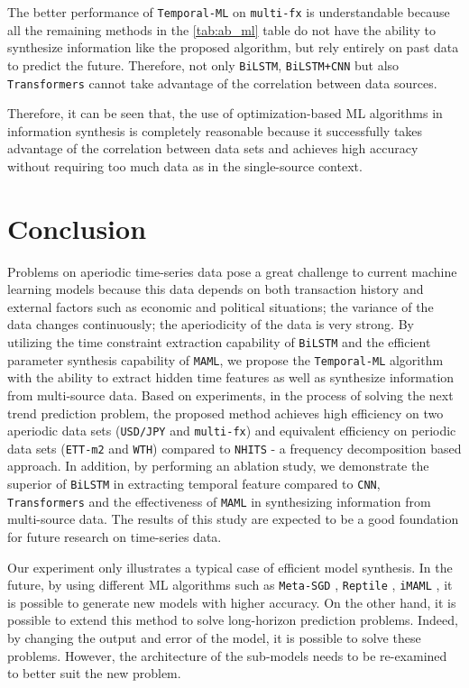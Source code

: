 \documentclass[a4paper,fleqn]{cas-sc}
\begin{document}
The better performance of \verb|Temporal-ML| on \verb|multi-fx| is understandable because all the remaining methods in the \ref{tab:ab_ml} table do not have the ability to synthesize information like the proposed algorithm, but rely entirely on past data to predict the future. Therefore, not only \verb|BiLSTM|, \verb|BiLSTM+CNN| but also \verb|Transformers| cannot take advantage of the correlation between data sources.

Therefore, it can be seen that, the use of optimization-based ML algorithms in information synthesis is completely reasonable because it successfully takes advantage of the correlation between data sets and achieves high accuracy without requiring too much data as in the single-source context.

\section{Conclusion}

Problems on aperiodic time-series data pose a great challenge to current machine learning models because this data depends on both transaction history and external factors such as economic and political situations; the variance of the data changes continuously; the aperiodicity of the data is very strong. By utilizing the time constraint extraction capability of \verb|BiLSTM| and the efficient parameter synthesis capability of \verb|MAML|, we propose the \verb|Temporal-ML| algorithm with the ability to extract hidden time features as well as synthesize information from multi-source data. Based on experiments, in the process of solving the next trend prediction problem, the proposed method achieves high efficiency on two aperiodic data sets (\verb|USD/JPY| and \verb|multi-fx|) and equivalent efficiency on periodic data sets (\verb|ETT-m2| and \verb|WTH|) compared to \verb|NHITS| - a frequency decomposition based approach. In addition, by performing an ablation study, we demonstrate the superior of \verb|BiLSTM| in extracting temporal feature compared to \verb|CNN|, \verb|Transformers| and the effectiveness of \verb|MAML| in synthesizing information from multi-source data. The results of this study are expected to be a good foundation for future research on time-series data.

Our experiment only illustrates a typical case of efficient model synthesis. In the future, by using different ML algorithms such as \verb|Meta-SGD| \cite{li2017meta}, \verb|Reptile| \cite{nichol2018first}, \verb|iMAML| \cite{rajeswaran2019meta}, it is possible to generate new models with higher accuracy. On the other hand, it is possible to extend this method to solve long-horizon prediction problems. Indeed, by changing the output and error of the model, it is possible to solve these problems. However, the architecture of the sub-models needs to be re-examined to better suit the new problem.
\end{document}
